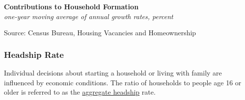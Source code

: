 \documentclass{report}
\makeatletter
\newcommand{\tbllink}[1]{\href{https://raw.githubusercontent.com/bdecon/US-chartbook/master/chartbook/data/#1}{\faTable}}
\newcommand*\short[1]{\expandafter\@gobbletwo\number\numexpr#1\relax}
\newcommand{\sbaral}[4]{
		\addplot[ybar stacked, bar width=2.45pt, draw opacity=0, fill=#1, area legend] 
			table [x=#2, y=#3, col sep=comma]{#4};}
\newcommand{\absnode}[3]{\node[below right, align=left] at (axis cs: #1,#2) {#3};}
\newcommand{\dateaxisticks}{
		date coordinates in=x, axis line style={draw=none},
		xmax={2022-03-15},
		max space between ticks=40,	    
		xtick={{1990-01-01}, {1992-01-01}, {1994-01-01}, 
			{1996-01-01}, {1998-01-01}, {2000-01-01}, 
			{2002-01-01}, {2004-01-01}, {2006-01-01},
			{2008-01-01}, {2010-01-01}, {2012-01-01}, {2014-01-01},
		    {2016-01-01}, {2018-01-01}, {2020-01-01}, {2022-01-01}, 
		    {2024-01-01}, {2026-01-01}},
		minor xtick={{1989-01-01}, {1991-01-01}, {1993-01-01},
			{1995-01-01}, {1997-01-01}, {1999-01-01}, 
			{2001-01-01}, {2003-01-01}, {2005-01-01}, {2007-01-01},
		    {2009-01-01}, {2011-01-01}, {2013-01-01}, {2015-01-01},
		    {2017-01-01}, {2019-01-01}, {2021-01-01}, {2023-01-01}, 
		    {2025-01-01}, {2027-01-01}},
		enlarge y limits={0.06}, enlarge x limits={0.01},
		}
\newcommand{\bbar}[2]{extra #1 ticks = {{#2}}, extra #1 tick labels = ,
		extra #1 tick style = {grid=major, grid style={thick, black!25}},}
\newcommand{\stdline}[4]{\addplot[very thick, no markers, color=#1] 
		table [x=#2, y=#3, col sep=comma] {#4};	}
\newcommand{\rbars}{
		\fill[color=black!10] (axis cs:{1990-07-01},\pgfkeysvalueof{/pgfplots/ymin}) rectangle 
			(axis cs:{1991-03-01}, \pgfkeysvalueof{/pgfplots/ymax});
		\fill[color=black!10] (axis cs:{2007-12-01},\pgfkeysvalueof{/pgfplots/ymin}) rectangle 
			(axis cs:{2009-07-01}, \pgfkeysvalueof{/pgfplots/ymax});
		\fill[color=black!10] (axis cs:{2001-03-01},\pgfkeysvalueof{/pgfplots/ymin}) rectangle 
			(axis cs:{2001-11-01}, \pgfkeysvalueof{/pgfplots/ymax});
		\fill[color=black!10] (axis cs:{2020-02-01},\pgfkeysvalueof{/pgfplots/ymin}) rectangle 
			(axis cs:{2020-05-01}, \pgfkeysvalueof{/pgfplots/ymax});}
\makeatother
\begin{document}
{\begin{minipage}{0.76\textwidth}

\vspace{1mm}

\normalsize \textbf{Contributions to Household Formation}\\
\footnotesize{\textit{one-year moving average of annual growth rates, percent}}
\vspace{3.8cm}

\hspace{3mm} 

\footnotesize{Source: Census Bureau, Housing Vacancies and Homeownership}  \hfill \tbllink{hhform.csv}
\end{minipage}
\newpage
\begin{minipage}{0.76\textwidth}
\subsubsection*{Headship Rate}
\small Individual decisions about starting a household or living with family are influenced by economic conditions. The ratio of households to people age 16 or older is referred to as the \href{https://www.federalreserve.gov/econres/notes/feds-notes/an-early-evaluation-of-the-effects-of-the-pandemic-on-living-arrangements-and-household-formation-20200807.htm}{aggregate headship} rate. 
\end{minipage}

}
\end{document}
